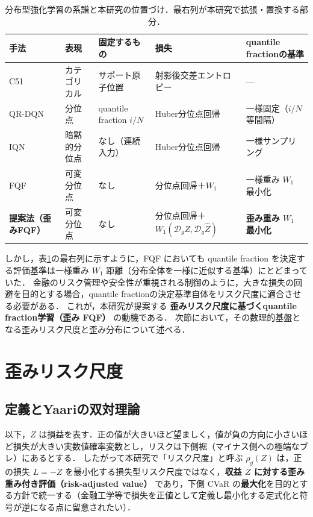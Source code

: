 \documentclass[a4paper,10pt]{jsarticle}
\theoremstyle{definition}
\newcommand{\Wone}{W_1}
\newcommand{\dist}{\mathcal{D}_g}
\begin{document}
\begin{table}[htbp]
\centering
\caption{分布型強化学習の系譜と本研究の位置づけ．最右列が本研究で拡張・置換する部分．}
\label{tab:lineage}
\small
\setlength{\tabcolsep}{2pt}
\begin{tabular}{lllll}
\toprule
手法 & 表現 & 固定するもの & 損失 & quantile fractionの基準\\
\midrule
C51 \cite{bellemare2017c51} & カテゴリカル & サポート原子位置 & 射影後交差エントロピー & ---\\
QR-DQN \cite{dabney2018qrdqn} & 分位点 & quantile fraction $i/N$ & Huber分位点回帰 & 一様固定（$i/N$ 等間隔）\\
IQN \cite{dabney2018iqn} & 暗黙的分位点 & なし（連続入力） & Huber分位点回帰 & 一様サンプリング\\
FQF \cite{yang2019fqf} & 可変分位点 & なし & 分位点回帰＋$\Wone$ & 一様重み $\Wone$ 最小化\\
\midrule
\textbf{提案法（歪みFQF）} & 可変分位点 & なし & 分位点回帰＋$\Wone(\dist Z,\dist\hat Z)$ & \textbf{歪み重み $\Wone$ 最小化}\\
\bottomrule
\end{tabular}
\end{table}

しかし，表\ref{tab:lineage}の最右列に示すように，FQF においても quantile fraction を決定する評価基準は一様重み $\Wone$ 距離（分布全体を一様に近似する基準）にとどまっていた．
金融のリスク管理や安全性が重視される制御のように，大きな損失の回避を目的とする場合，quantile fractionの決定基準自体をリスク尺度に適合させる必要がある．
これが，本研究が提案する \textbf{歪みリスク尺度に基づくquantile fraction学習（歪み FQF）} の動機である．
次節において，その数理的基盤となる歪みリスク尺度と歪み分布について述べる．

\section{歪みリスク尺度}
\label{sec:drm}

\subsection{定義とYaariの双対理論}
以下，$Z$ は損益を表す．正の値が大きいほど望ましく，値が負の方向に小さいほど損失が大きい実数値確率変数とし，リスクは下側裾（マイナス側への極端なブレ）にあるとする．
したがって本研究で「リスク尺度」と呼ぶ $\rho_g(Z)$ は，正の損失 $L=-Z$ を最小化する損失型リスク尺度ではなく，\textbf{収益 $Z$ に対する歪み重み付き評価（risk-adjusted value）} であり，下側 CVaR の\textbf{最大化}を目的とする方針で統一する（金融工学等で損失を正値として定義し最小化する定式化と符号が逆になる点に留意されたい）．
\end{document}
